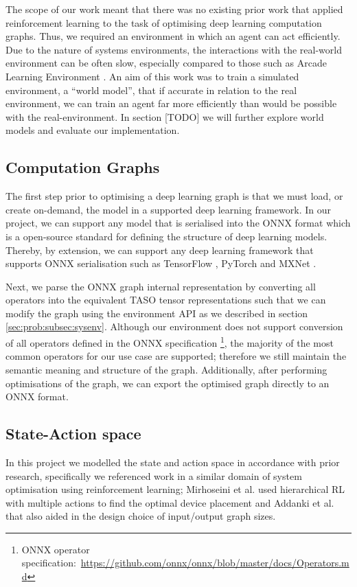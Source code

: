 The scope of our work meant that there was no existing prior work that applied reinforcement learning to the task of optimising deep learning computation graphs. Thus, we required an environment in which an agent can act efficiently. Due to the nature of systems environments, the interactions with the real-world environment can be often slow, especially compared to those such as Arcade Learning Environment \cite{Bellemare_2013}. An aim of this work was to train a simulated environment, a ``world model'', that if accurate in relation to the real environment, we can train an agent far more efficiently than would be possible with the real-environment. In section [TODO] we will further explore world models and evaluate our implementation.

\subsection{Computation Graphs}
The first step prior to optimising a deep learning graph is that we must load, or create on-demand, the model in a supported deep learning framework. In our project, we can support any model that is serialised into the ONNX \cite{bai2019onnx} format which is a open-source standard for defining the structure of deep learning models. Thereby, by extension, we can support any deep learning framework that supports ONNX serialisation such as TensorFlow \cite{tensorflow2015-whitepaper}, PyTorch \cite{pytorch} and MXNet \cite{chen2015mxnet}.

Next, we parse the ONNX graph internal representation by converting all operators into the equivalent TASO tensor representations such that we can modify the graph using the environment API as we described in section \ref{sec:prob:subsec:sysenv}. Although our environment does not support conversion of all operators defined in the ONNX specification \footnote{ONNX operator specification:~\url{https://github.com/onnx/onnx/blob/master/docs/Operators.md}}, the majority of the most common operators for our use case are supported; therefore we still maintain the semantic meaning and structure of the graph. Additionally, after performing optimisations of the graph, we can export the optimised graph directly to an ONNX format.

\subsection{State-Action space}
\label{sec:prob:subsec:sap}
In this project we modelled the state and action space in accordance with prior research, specifically we referenced work in a similar domain of system optimisation using reinforcement learning; Mirhoseini et al. \cite{mirhoseini2018hierarchical} used hierarchical RL with multiple actions to find the optimal device placement and Addanki et al. \cite{addanki2019placeto} that also aided in the design choice of input/output graph sizes.

